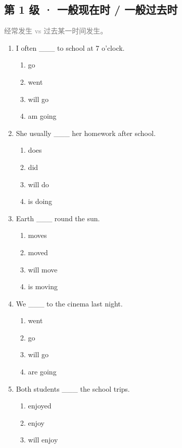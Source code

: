 \documentclass[11pt,a4paper]{ctexart}
\begin{document}
\subsection*{第 1 级 · 一般现在时 / 一般过去时}
\noindent\textcolor{gray}{经常发生 vs 过去某一时间发生。}\par\smallskip
\begin{enumerate}[leftmargin=*,itemsep=4pt]
\item I often \_\_\_ to school at 7 o’clock.
\begin{enumerate}[label=\Alph*.,leftmargin=2em,itemsep=1pt,topsep=2pt]
\item go
\item went
\item will go
\item am going
\end{enumerate}
\item She usually \_\_\_ her homework after school.
\begin{enumerate}[label=\Alph*.,leftmargin=2em,itemsep=1pt,topsep=2pt]
\item does
\item did
\item will do
\item is doing
\end{enumerate}
\item Earth \_\_\_ round the sun.
\begin{enumerate}[label=\Alph*.,leftmargin=2em,itemsep=1pt,topsep=2pt]
\item moves
\item moved
\item will move
\item is moving
\end{enumerate}
\item We \_\_\_ to the cinema last night.
\begin{enumerate}[label=\Alph*.,leftmargin=2em,itemsep=1pt,topsep=2pt]
\item went
\item go
\item will go
\item are going
\end{enumerate}
\item Both students \_\_\_ the school trips.
\begin{enumerate}[label=\Alph*.,leftmargin=2em,itemsep=1pt,topsep=2pt]
\item enjoyed
\item enjoy
\item will enjoy

\end{enumerate}
\end{enumerate}
\end{document}
